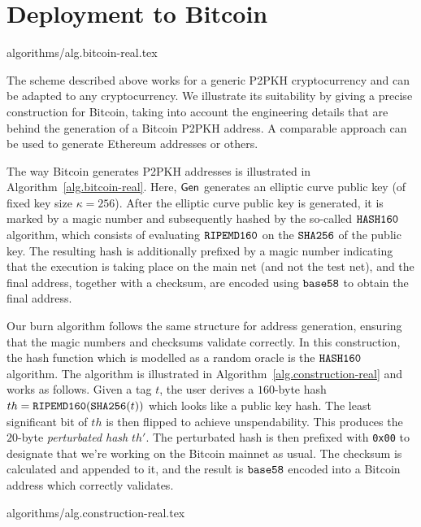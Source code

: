 \section{Deployment to Bitcoin}\label{sec.real}
{algorithms/alg.bitcoin-real.tex}

The scheme described above works for a generic P2PKH cryptocurrency and can be adapted to any cryptocurrency. We illustrate its suitability by giving a precise construction for Bitcoin, taking into account the engineering details that are behind the generation of a Bitcoin P2PKH address. A comparable approach can be used to generate Ethereum addresses or others.

The way Bitcoin generates P2PKH addresses is illustrated in Algorithm~\ref{alg.bitcoin-real}. Here, $\mathsf{Gen}$ generates an elliptic curve public key (of fixed key size $\kappa = 256$). After the elliptic curve public key is generated, it is marked by a magic number and subsequently hashed by the so-called $\texttt{HASH160}$ algorithm, which consists of evaluating $\texttt{RIPEMD160}$ on the $\texttt{SHA256}$ of the public key. The resulting hash is additionally prefixed by a magic number indicating that the execution is taking place on the main net (and not the test net), and the final address, together with a checksum, are encoded using $\texttt{base58}$ to obtain the final address.

Our burn algorithm follows the same structure for address generation, ensuring that the magic numbers and checksums validate correctly. In this construction, the hash function which is modelled as a random oracle is the $\texttt{HASH160}$ algorithm. The algorithm is illustrated in Algorithm~\ref{alg.construction-real} and works as follows.
Given a tag $t$, the user derives a $160$-byte
hash $th = \texttt{RIPEMD160}(\texttt{SHA256}(t))$ which looks like a public key hash.
The least significant bit of
$th$ is then flipped to achieve unspendability. This produces the $20$-byte
\emph{perturbated hash} $th'$. The perturbated hash
is then prefixed with \texttt{0x00} to designate that we're working on the Bitcoin mainnet as usual. The checksum is calculated and appended
to it, and the result is
$\texttt{base58}$ encoded into a Bitcoin address which correctly validates.

{algorithms/alg.construction-real.tex}

